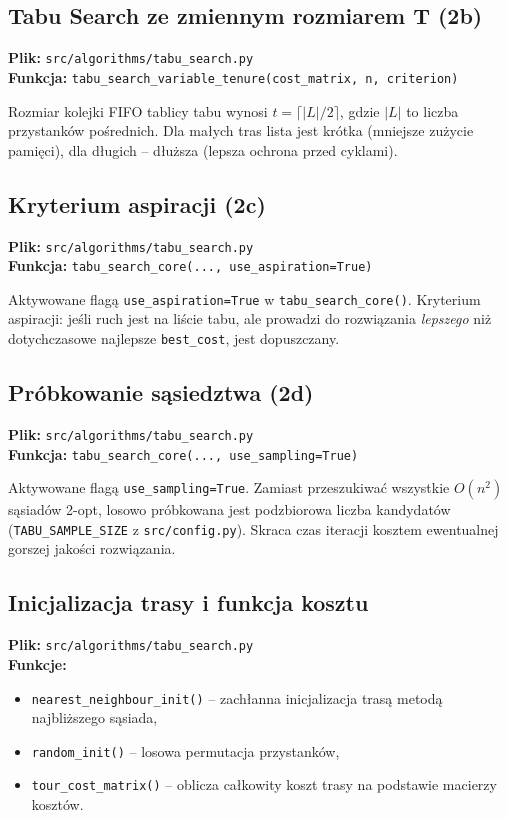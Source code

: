 \documentclass[12pt,a4paper]{article}
\begin{document}
\subsection{Tabu Search ze zmiennym rozmiarem T (2b)}

\textbf{Plik:} \texttt{src/algorithms/tabu\_search.py}\\
\textbf{Funkcja:} \texttt{tabu\_search\_variable\_tenure(cost\_matrix, n, criterion)}

Rozmiar kolejki FIFO tablicy tabu wynosi $t = \lceil |L| / 2 \rceil$, gdzie $|L|$
to liczba przystanków pośrednich. Dla małych tras lista jest krótka (mniejsze
zużycie pamięci), dla długich -- dłuższa (lepsza ochrona przed cyklami).

\subsection{Kryterium aspiracji (2c)}

\textbf{Plik:} \texttt{src/algorithms/tabu\_search.py}\\
\textbf{Funkcja:} \texttt{tabu\_search\_core(..., use\_aspiration=True)}

Aktywowane flagą \texttt{use\_aspiration=True} w \texttt{tabu\_search\_core()}.
Kryterium aspiracji: jeśli ruch jest na liście tabu, ale prowadzi do rozwiązania
\emph{lepszego} niż dotychczasowe najlepsze \texttt{best\_cost}, jest dopuszczany.

\subsection{Próbkowanie sąsiedztwa (2d)}

\textbf{Plik:} \texttt{src/algorithms/tabu\_search.py}\\
\textbf{Funkcja:} \texttt{tabu\_search\_core(..., use\_sampling=True)}

Aktywowane flagą \texttt{use\_sampling=True}. Zamiast przeszukiwać wszystkie
$O(n^2)$ sąsiadów 2-opt, losowo próbkowana jest podzbiorowa liczba kandydatów
(\texttt{TABU\_SAMPLE\_SIZE} z \texttt{src/config.py}). Skraca czas iteracji
kosztem ewentualnej gorszej jakości rozwiązania.

\subsection{Inicjalizacja trasy i funkcja kosztu}

\textbf{Plik:} \texttt{src/algorithms/tabu\_search.py}\\
\textbf{Funkcje:}
\begin{itemize}
    \item \texttt{nearest\_neighbour\_init()} -- zachłanna inicjalizacja trasą
          metodą najbliższego sąsiada,
    \item \texttt{random\_init()} -- losowa permutacja przystanków,
    \item \texttt{tour\_cost\_matrix()} -- oblicza całkowity koszt trasy na
          podstawie macierzy kosztów.
\end{itemize}
\end{document}
